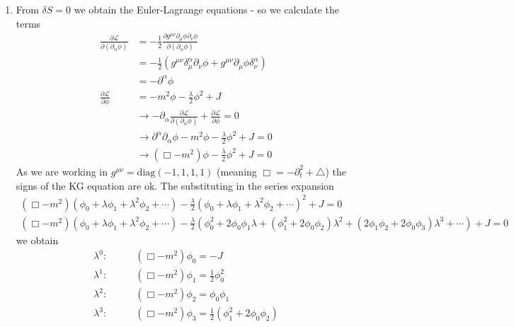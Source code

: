 \documentclass[10pt,a4paper]{article}
\theoremstyle{definition}
\begin{document}
\begin{enumerate}[1)]
\item From $\delta S=0$ we obtain the Euler-Lagrange equations - so we calculate the terms
\begin{align}
\frac{\partial\mathcal{L}}{\partial(\partial_\alpha\phi)}
&=-\frac{1}{2}\frac{\partial g^{\mu\nu}\partial_\mu\phi\partial_\nu\phi}{\partial(\partial_\alpha\phi)}\\
&=-\frac{1}{2}(g^{\mu\nu}\delta^\alpha_\mu\partial_\nu\phi+g^{\mu\nu}\partial_\mu\phi\delta^\alpha_\nu)\\
&=-\partial^\alpha\phi\\
\frac{\partial\mathcal{L}}{\partial\phi}&=-m^2\phi-\frac{\lambda}{2}\phi^2+J\\
&\rightarrow-\partial_\alpha\frac{\partial\mathcal{L}}{\partial(\partial_\alpha\phi)}+\frac{\partial\mathcal{L}}{\partial\phi}=0\\
&\rightarrow\partial^\alpha\partial_\alpha\phi-m^2\phi-\frac{\lambda}{2}\phi^2+J=0\\
&\rightarrow(\Box - m^2) \phi - \frac{\lambda}{2} \phi^2 +J=0
\end{align}
As we are working in $g^{\mu\nu} = \text{diag}(-1,1,1,1)$ (meaning $\Box=-\partial_t^2+\triangle$) the signs of the KG equation are ok. The substituting in the series expansion
\begin{align*}
(\Box - m^2) (\phi_0 + \lambda \phi_1 + \lambda^2 \phi_2 + \cdots) - \frac{\lambda}{2} (\phi_0 + \lambda \phi_1 + \lambda^2 \phi_2 + \cdots)^2 +J=0\\
(\Box - m^2) (\phi_0 + \lambda \phi_1 + \lambda^2 \phi_2 + \cdots) - \frac{\lambda}{2} (\phi_0^2 + 
 2 \phi_0 \phi_1 \lambda + (\phi_1^2 + 
    2 \phi_0 \phi_2) \lambda^2 + (2 \phi_1 \phi_2 + 
    2 \phi_0 \phi_3) \lambda^3 + \cdots) +J=0
\end{align*}
we obtain
\begin{align}
\lambda^0:\qquad&(\Box - m^2) \phi_0=-J\\
\lambda^1:\qquad&(\Box - m^2) \phi_1=\frac{1}{2} \phi_0^2\\
\lambda^2:\qquad&(\Box - m^2) \phi_2=\phi_0 \phi_1\\
\lambda^3:\qquad&(\Box - m^2) \phi_3=\frac{1}{2}(\phi_1^2+2\phi_0 \phi_2)
\end{align}


\end{enumerate}
\end{document}
